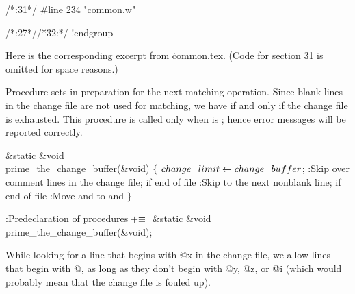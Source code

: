 {{/*:31*/
#line 234 "common.w"

}

/*:27*//*32:*/
!endgroup
\endgroup
\vfill\eject

\def\runninghead{APPENDIX A --- TRANSLATION BY {\tentt CWEAVE}}

Here is the corresponding excerpt from \.{common.tex}.
(Code for section 31 is omitted for space reasons.)

\vskip6pt
\begingroup \def\tt{\eighttt} \baselineskip9pt
\verbatim
{}Procedure 
sets  in preparation for the next matching operation.
Since blank lines in the change file are not used for matching, we have
 if and only if
the change file is exhausted. This procedure is called only when
 is ; hence error messages will be reported
correctly.

\Y\B\1\1\&{static} \&{void} \\{prime\_the\_change\_buffer}(\&{void})\2\2\6
${}\{{}$\1\6
${}\\{change\_limit}\leftarrow\\{change\_buffer}{}$;\6
:Skip over comment lines in the change file;  if end of file%
\X\6
:Skip to the next nonblank line;  if end of file\X\6
:Move  and  to  and %
\X\6
\4${}\}{}$\2\par
\fi

\B{}:Predeclaration of procedures\X${}\mathrel+\equiv{}$\5
\&{static} \&{void} \\{prime\_the\_change\_buffer}(\&{void});\par
\fi

While looking for a line that begins with \.{@x} in the change file, we
allow lines that begin with \.{@}, as long as they don't begin with \.{@y},
\.{@z}, or \.{@i} (which would probably mean that the change file is fouled
up).

}
